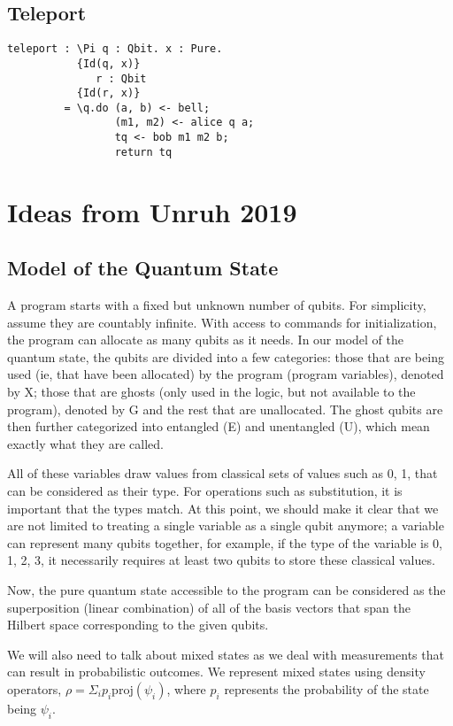 \documentclass[acmsmall,nonacm,timestamp,review=false,anonymous=false]{acmart}
\begin{document}
\subsection{Teleport}
\begin{lstlisting}[language=QHaskell]
teleport : \Pi q : Qbit. x : Pure.
           {Id(q, x)}
              r : Qbit
           {Id(r, x)}
         = \q.do (a, b) <- bell;
                 (m1, m2) <- alice q a;
                 tq <- bob m1 m2 b;
                 return tq
\end{lstlisting}

\section{Ideas from Unruh 2019}
\subsection{Model of the Quantum State}
A program starts with a fixed but unknown number of qubits. For simplicity, assume they are countably infinite.
With access to commands for initialization, the program can allocate as many qubits as it needs.
In our model of the quantum state, the qubits are divided into a few categories: those that are being used (ie, that have been allocated) by the program (program variables), denoted by X; those that are ghosts (only used in the logic, but not available to the program), denoted by G and the rest that are unallocated. The ghost qubits are then further categorized into entangled (E) and unentangled (U), which mean exactly what they are called.

All of these variables draw values from classical sets of values such as {0, 1}, that can be considered as their type. For operations such as substitution, it is important that the types match. At this point, we should make it clear that we are not limited to treating a single variable as a single qubit anymore; a variable can represent many qubits together, for example, if the type of the variable is {0, 1, 2, 3}, it necessarily requires at least two qubits to store these classical values.

Now, the pure quantum state accessible to the program can be considered as the superposition (linear combination) of all of the basis vectors that span the Hilbert space corresponding to the given qubits.

We will also need to talk about mixed states as we deal with measurements that can result in probabilistic outcomes. We represent mixed states using density operators, $\rho = \Sigma_i p_i \mathrm{proj}(\psi_i)$, where $p_i$ represents the probability of the state being $\psi_i$.
\end{document}
